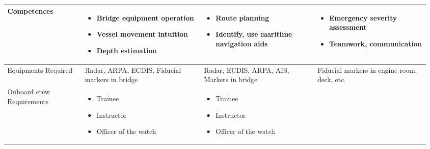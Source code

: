 \begin{table}[h]
\begin{tabular}{@{}p{2.3cm}|p{3.4cm}|p{3.4cm}|p{3.4cm}|@{}}
\hline
Competences & \vspace{-2mm}\begin{itemize}[leftmargin=*,topsep=0pt,partopsep=0pt,align=left,itemsep=0cm]
\renewcommand{\labelitemi}{\tiny\listsymb} 
\item Bridge equipment operation
\item Vessel movement intuition
\item Depth estimation  
\end{itemize}
\vspace{-\baselineskip}
& \vspace{-2mm}\begin{itemize}[leftmargin=*,topsep=0pt,partopsep=0pt,align=left,itemsep=0cm]
\renewcommand{\labelitemi}{\tiny\listsymb} 
\item Route planning
\item Identify, use maritime navigation aids
\end{itemize}
& \vspace{-2mm}\begin{itemize}[leftmargin=*,topsep=0pt,partopsep=0pt,align=left,itemsep=0cm]
\renewcommand{\labelitemi}{\tiny\listsymb} 
\item Emergency severity assessment 
\item Teamwork, communication 
\end{itemize} \vspace{-\baselineskip} \\
\hline
Equipments Required & Radar, ARPA, ECDIS, Fiducial markers in bridge & Radar, ECDIS, ARPA, AIS, Markers in bridge & Fiducial markers in engine room, deck, etc. \\
\hline
Onboard crew Requirements & 
\vspace{-2mm} \begin{itemize}[leftmargin=*,topsep=0pt,partopsep=0pt,align=left,itemsep=0cm]
\renewcommand{\labelitemi}{\tiny\listsymb} 
\item Trainee 
\item Instructor
\item Officer of the watch
\end{itemize}
&\vspace{-2mm} \begin{itemize}[leftmargin=*,topsep=0pt,partopsep=0pt,align=left,itemsep=0cm]
\renewcommand{\labelitemi}{\tiny\listsymb} 
\item Trainee 
\item Instructor
\item Officer of the watch
\end{itemize}

\end{tabular}
\end{table}
